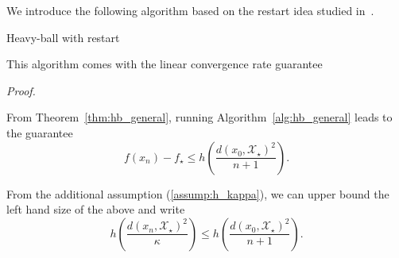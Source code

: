    We introduce the following algorithm based on the restart idea studied in~\citep{nemirovskii1985optimal, nesterov2013gradient, iouditski2014primal}.

    \begin{algorithm}
        \caption{Heavy-ball with restart}
        \label{alg:hb_restart}
    \end{algorithm}

    This algorithm comes with the linear convergence rate guarantee

    \begin{center}
    \end{center}

    \noindent \textit{Proof.}

        From Theorem~\ref{thm:hb_general}, running Algorithm~\ref{alg:hb_general} leads to the guarantee
        \begin{equation}
            f(x_n) - f_\star \leq h\left(\frac{d\left(x_0, \mathcal{X}_\star\right)^2}{n+1} \right).
        \end{equation}

        From the additional assumption (\ref{assump:h_kappa}), we can upper bound the left hand size of the above and write
        \begin{equation*}
            h\left( \frac{ d(x_n, \mathcal{X}_\star)^2}{\kappa} \right) \leq h\left(\frac{d\left(x_0, \mathcal{X}_\star\right)^2}{n+1} \right).
        \end{equation*}

